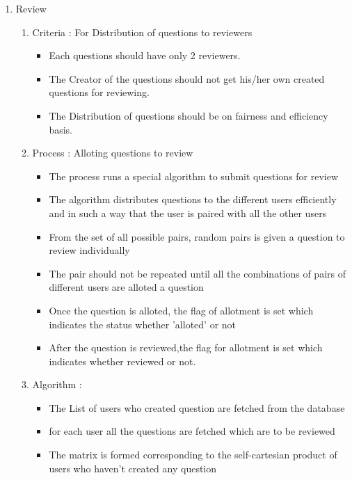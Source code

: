 \documentclass[a4paper,12pt,oneside]{book}
\begin{document}
\begin{enumerate}
        \item Review
            \begin{enumerate}
                \item Criteria : For Distribution of questions to reviewers
                \begin{itemize}
                    \item Each questions should have only 2 reviewers.
                    \item  The Creator of the questions should not get his/her own created questions for reviewing.
                    \item  The Distribution of questions should be on fairness and efficiency basis.
                \end{itemize}
            \item Process : Alloting questions to review
                \begin{itemize}
                    \item  The process runs a special algorithm to submit questions for review 
                    \item  The algorithm distributes questions to the different users efficiently and in such a way that the user is paired with all the other users
                    \item  From the set of all possible pairs, random pairs is given a question to review individually
                    \item The pair should not be repeated until all the combinations of pairs of different users are alloted a question
                    \item Once the question is alloted, the flag of allotment is set which indicates the status whether 'alloted' or not
                    \item After the question is reviewed,the flag for allotment is set which indicates whether reviewed or not.
                \end{itemize}
            \item Algorithm :
                \begin{itemize}
                    \item The List of users who created question are fetched from the database 
                    \item for each user all the questions are fetched which are to be reviewed
                    \item The matrix is formed corresponding to the self-cartesian product of users who haven't created any question

\end{itemize}
\end{enumerate}
\end{enumerate}
\end{document}
